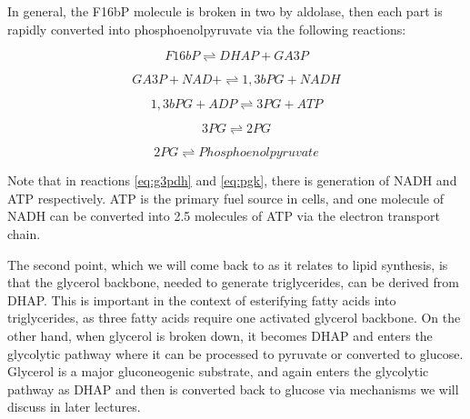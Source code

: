 \documentclass{tufte-handout}
\begin{document}
  In general, the F16bP molecule is broken in two by aldolase, then each part is rapidly converted into phosphoenolpyruvate via the following reactions:

\begin{equation}\label{eq:aldolase-a}
F16bP \rightleftharpoons DHAP+ GA3P
\end{equation}

\begin{equation}\label{eq:g3pdh}
GA3P + NAD+ \rightleftharpoons 1,3bPG  + NADH
\end{equation}

\begin{equation}\label{eq:pgk}
1,3bPG + ADP \rightleftharpoons 3PG + ATP
\end{equation}

\begin{equation}
3PG \rightleftharpoons 2PG
\end{equation}

\begin{equation}
2PG \rightleftharpoons Phosphoenolpyruvate
\end{equation}

Note that in reactions \ref{eq:g3pdh} and \ref{eq:pgk}, there is generation of NADH and ATP respectively.  ATP is the primary fuel source in cells, and one molecule of NADH can be converted into 2.5 molecules of ATP via the electron transport chain.  

The second point, which we will come back to as it relates to lipid synthesis, is that the glycerol backbone, needed to generate triglycerides, can be derived from DHAP.  This is important in the context of esterifying fatty acids into triglycerides, as three fatty acids require one activated glycerol backbone.  On the other hand, when glycerol is broken down, it becomes DHAP and enters the glycolytic pathway where it can be processed to pyruvate or converted to glucose.  Glycerol is a major gluconeogenic substrate, and again enters the glycolytic pathway as DHAP and then is converted back to glucose via mechanisms we will discuss in later lectures.
\end{document}
